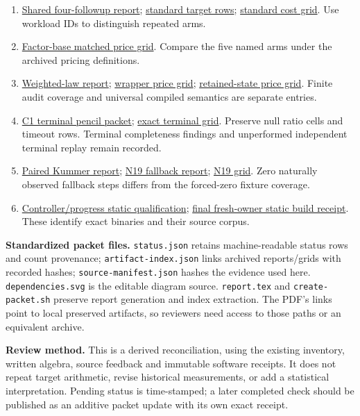 \documentclass[11pt]{article}
\newcommand{\Pbase}{/home/ec2-user/pencil-controller-review-20261029/c1-takeover-20261030}
\newcommand{\Hbase}{/home/ec2-user/crypto-pr2304-persist/research}
\newcommand{\Cbase}{/home/ec2-user/crypto-pencil-signed-graph-20261029/research}
\begin{document}
\begin{enumerate}
\item \href{\Hbase/four_followups_review_20261022/REPORT.pdf}{Shared four-followup report}; \href{\Hbase/four_followups_review_20261022/results/standard-targets.csv}{standard target rows}; \href{\Hbase/four_followups_review_20261022/results/standard-cost-grid.csv}{standard cost grid}. Use workload IDs to distinguish repeated arms.
\item \href{\Hbase/four_followups_20261021/results/matched/price-grid.csv}{Factor-base matched price grid}. Compare the five named arms under the archived pricing definitions.
\item \href{\Hbase/projective_law_followup_20261022/REPORT.pdf}{Weighted-law report}; \href{\Hbase/projective_law_followup_20261022/results/price-grid-projective.csv}{wrapper price grid}; \href{\Hbase/projective_law_followup_20261022/results/price-grid-state.csv}{retained-state price grid}. Finite audit coverage and universal compiled semantics are separate entries.
\item \href{\Cbase/pencil_large_prime_20261029/validation/accounting/reports/run-20261030T0543Z-c1-terminal/review-packet.pdf}{C1 terminal pencil packet}; \href{\Cbase/pencil_large_prime_20261029/validation/accounting/reports/run-20261030T0543Z-c1-terminal/cost-grid-exact.csv}{exact terminal grid}. Preserve null ratio cells and timeout rows. Terminal completeness findings and unperformed independent terminal replay remain recorded.
\item \href{\Hbase/kummer_differential_collector_20261022/KUMMER_PAIRED.pdf}{Paired Kummer report}; \href{\Hbase/kummer_differential_collector_20261022/n19-labelled-fallback/REPORT.pdf}{N19 fallback report}; \href{\Hbase/kummer_differential_collector_20261022/n19-labelled-fallback/results/analysis/price-grid.csv}{N19 grid}. Zero naturally observed fallback steps differs from the forced-zero fixture coverage.
\item \href{\Pbase/controller-progress-static-qualification-v1/QUALIFICATION.json}{Controller/progress static qualification}; \href{\Pbase/fresh-owner-static-qualification-v2/BUILD-RECEIPT.json}{final fresh-owner static build receipt}. These identify exact binaries and their source corpus.
\end{enumerate}

\textbf{Standardized packet files.} \texttt{status.json} retains machine-readable status rows and count provenance; \texttt{artifact-index.json} links archived reports/grids with recorded hashes; \texttt{source-manifest.json} hashes the evidence used here. \texttt{dependencies.svg} is the editable diagram source. \texttt{report.tex} and \texttt{create-packet.sh} preserve report generation and index extraction. The PDF's links point to local preserved artifacts, so reviewers need access to those paths or an equivalent archive.

\textbf{Review method.} This is a derived reconciliation, using the existing inventory, written algebra, source feedback and immutable software receipts. It does not repeat target arithmetic, revise historical measurements, or add a statistical interpretation. Pending status is time-stamped; a later completed check should be published as an additive packet update with its own exact receipt.
\end{document}
